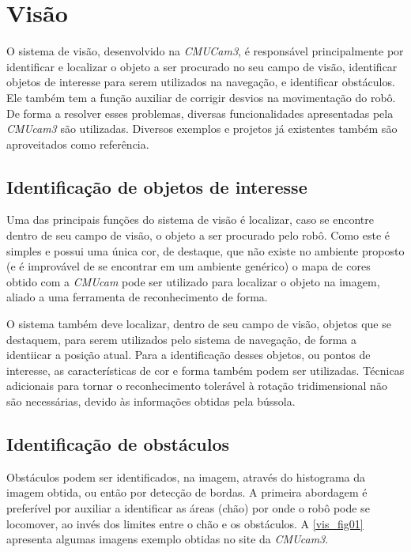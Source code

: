 \chapter{Visão}

O sistema de visão, desenvolvido na \textit{CMUCam3}, é responsável principalmente por identificar e localizar o objeto a ser procurado no seu campo de visão, identificar objetos de interesse para serem utilizados na navegação, e identificar obstáculos. Ele também tem a função auxiliar de corrigir desvios na movimentação do robô. De forma a resolver esses problemas, diversas funcionalidades apresentadas pela \textit{CMUcam3} são utilizadas. Diversos exemplos e projetos já existentes também são aproveitados como referência.

\section{Identificação de objetos de interesse}

Uma das principais funções do sistema de visão é localizar, caso se encontre dentro de seu campo de visão, o objeto a ser procurado pelo robô. Como este é simples e possui uma única cor, de destaque, que não existe no ambiente proposto (e é improvável de se encontrar em um ambiente genérico) o mapa de cores obtido com a \textit{CMUcam} pode ser utilizado para localizar o objeto na imagem, aliado a uma ferramenta de reconhecimento de forma.

O sistema também deve localizar, dentro de seu campo de visão, objetos que se destaquem, para serem utilizados pelo sistema de navegação, de forma a identiicar a posição atual. Para a identificação desses objetos, ou pontos de interesse, as características de cor e forma também podem ser utilizadas. Técnicas adicionais para tornar o reconhecimento tolerável à rotação tridimensional não são necessárias, devido às informações obtidas pela bússola.

\section{Identificação de obstáculos}

Obstáculos podem ser identificados, na imagem, através do histograma da imagem obtida, ou então por detecção de bordas. A primeira abordagem é preferível por auxiliar a identificar as áreas (chão) por onde o robô pode se locomover, ao invés dos limites entre o chão e os obstáculos. A \ref{vis_fig01} apresenta algumas imagens exemplo obtidas no site da \textit{CMUcam3}.

